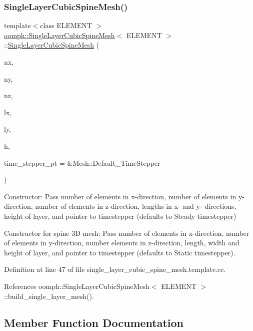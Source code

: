 \subsubsection{\texorpdfstring{Single\+Layer\+Cubic\+Spine\+Mesh()}{SingleLayerCubicSpineMesh()}}
{\footnotesize\ttfamily template$<$class E\+L\+E\+M\+E\+NT $>$ \\
\hyperlink{classoomph_1_1SingleLayerCubicSpineMesh}{oomph\+::\+Single\+Layer\+Cubic\+Spine\+Mesh}$<$ E\+L\+E\+M\+E\+NT $>$\+::\hyperlink{classoomph_1_1SingleLayerCubicSpineMesh}{Single\+Layer\+Cubic\+Spine\+Mesh} (\begin{DoxyParamCaption}\item[{const unsigned \&}]{nx,  }\item[{const unsigned \&}]{ny,  }\item[{const unsigned \&}]{nz,  }\item[{const double \&}]{lx,  }\item[{const double \&}]{ly,  }\item[{const double \&}]{h,  }\item[{Time\+Stepper $\ast$}]{time\+\_\+stepper\+\_\+pt = {\ttfamily \&Mesh\+:\+:Default\+\_\+TimeStepper} }\end{DoxyParamCaption})}



Constructor\+: Pass number of elements in x-\/direction, number of elements in y-\/direction, number of elements in z-\/direction, lengths in x-\/ and y-\/ directions, height of layer, and pointer to timestepper (defaults to Steady timestepper) 

Constructor for spine 3D mesh\+: Pass number of elements in x-\/direction, number of elements in y-\/direction, number elements in z-\/direction, length, width and height of layer, and pointer to timestepper (defaults to Static timestepper). 

Definition at line 47 of file single\+\_\+layer\+\_\+cubic\+\_\+spine\+\_\+mesh.\+template.\+cc.



References oomph\+::\+Single\+Layer\+Cubic\+Spine\+Mesh$<$ E\+L\+E\+M\+E\+N\+T $>$\+::build\+\_\+single\+\_\+layer\+\_\+mesh().



\subsection{Member Function Documentation}
\mbox{\label{classoomph_1_1SingleLayerCubicSpineMesh_a975e6943dbdcf2474c78261d3ec00f28}} 
